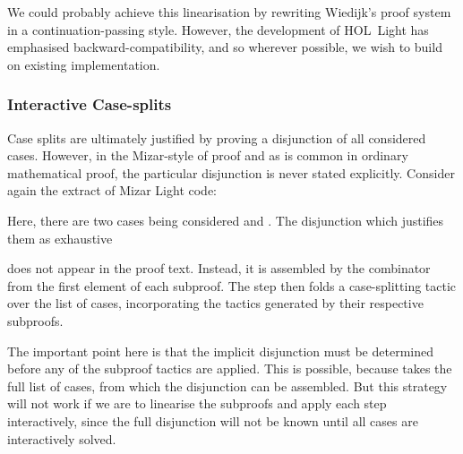 We could probably achieve this linearisation by rewriting Wiedijk's proof system in a continuation-passing style. However, the development of HOL~Light has emphasised backward-compatibility, and so wherever possible, we wish to build on existing implementation.

\subsubsection{Interactive Case-splits}
Case splits are ultimately justified by proving a disjunction of all considered cases. However, in the Mizar-style of proof and as is common in ordinary mathematical proof, the particular disjunction is never stated explicitly. Consider again the extract of Mizar Light code:

\vspace{0.5cm}
\begin{minipage}{\linewidth}
  \footnotesize

  \code{\quad\enspace[[suppose "p1 = p2";}

  \code{\qquad\enspace qed from [0] by [LEMMA1]];}

  \code{\qquad [suppose "$\neg$(p1 = p2)";}

  \code{\qquad\enspace qed from [1]]]];}
\end{minipage}
\vspace{0.5cm}

{\samepage Here, there are two cases being considered  and . The disjunction which justifies them as exhaustive
\begin{center}\end{center}}

\noindent does not appear in the proof text. Instead, it is assembled by the  combinator from the first element of each subproof. The step then folds a case-splitting tactic over the list of cases, incorporating the tactics generated by their respective subproofs.

The important point here is that the implicit disjunction must be determined before any of the subproof tactics are applied. This is possible, because  takes the full list of cases, from which the disjunction can be assembled. But this strategy will not work if we are to linearise the subproofs and apply each step interactively, since the full disjunction will not be known until all cases are interactively solved.

